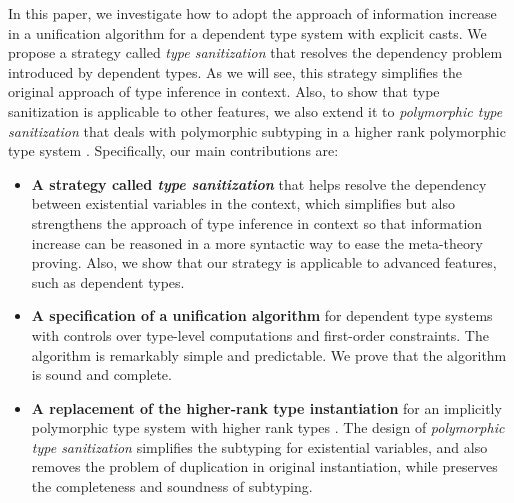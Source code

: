 In this paper, we investigate how to adopt the approach of information increase
in a unification algorithm for a dependent type system with
explicit casts. We propose a strategy called \textit{type sanitization} that
resolves the dependency problem introduced by dependent types. As we will see,
this strategy simplifies the original approach of type inference in context.
Also, to show that type sanitization is applicable to other features, we also
extend it to \textit{polymorphic type sanitization} that deals with polymorphic
subtyping in a higher rank polymorphic type system \citep{dunfield2013complete}.
Specifically, our main contributions are:

\begin{itemize}
\item \textbf{A strategy called \textit{type sanitization}} that helps resolve
  the dependency between existential variables in the context, which simplifies
  but also strengthens the approach of type inference in context
  \citep{gundry2010type} so that information increase can be reasoned in a more
  syntactic way to ease the meta-theory proving. Also, we show that our strategy
  is applicable to advanced features, such as dependent types.
\item \textbf{A specification of a unification algorithm} for dependent type
  systems with controls over type-level computations and first-order
  constraints. The algorithm is remarkably simple and predictable. We prove that
  the algorithm is sound and complete.
\item \textbf{A replacement of the higher-rank type instantiation} for an
  implicitly polymorphic type system with higher rank types
  \citep{dunfield2013complete}. The design of \textit{polymorphic type
    sanitization} simplifies the subtyping for existential variables, and also
  removes the problem of duplication in original instantiation, while preserves
  the completeness and soundness of subtyping.
\end{itemize}

